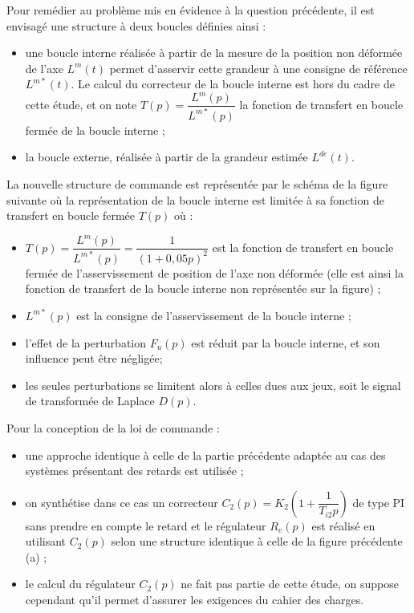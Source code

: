 Pour remédier au problème mis en évidence à la question précédente, il est envisagé une structure à deux boucles définies ainsi :
\begin{itemize}
\item une boucle interne réalisée à partir de la mesure de la position non déformée de l’axe $L^m(t)$ permet d’asservir cette grandeur à une consigne de référence $L^{m*}(t)$. Le calcul du correcteur de la boucle interne est hors du cadre de cette étude, et on note $T(p)=\dfrac{L^m(p)}{L^{m*}(p)}$ la fonction de transfert en boucle fermée de la boucle
interne ;
\item la boucle externe, réalisée à partir de la grandeur estimée $L^{de}(t)$.
\end{itemize}
La nouvelle structure de commande est représentée par le schéma de la figure suivante où la représentation de la
boucle interne est limitée à sa fonction de transfert en boucle fermée $T(p)$ où :
\begin{itemize}
\item $T(p) = \dfrac{L^m(p)}{L^{m*}(p)}= \dfrac{1}{\left(1+0,05p\right)^2}$ est la fonction de transfert en boucle fermée de l’asservissement de position de l’axe non déformée (elle est ainsi la fonction de transfert de la boucle interne non représentée sur la figure) ;
\item $L^{m*}(p)$ est la consigne de l’asservissement de la boucle interne ;
\item l’effet de la perturbation $F_u(p)$ est réduit par la boucle interne, et son influence peut être négligée;
\item les seules perturbations se limitent alors à celles dues aux jeux, soit le signal de transformée de Laplace $D(p)$.
\end{itemize}
Pour la conception de la loi de commande :
\begin{itemize}
\item une approche identique à celle de la partie précédente adaptée au cas des systèmes présentant des retards est utilisée ;
\item on synthétise dans ce cas un correcteur $C_2(p) = K_2 \left( 1+\dfrac{1}{T_{i2}p}\right) $ de type PI sans prendre en compte le retard et le régulateur $R_e(p)$ est réalisé en utilisant $C_2(p)$ selon une structure identique à celle de la figure précédente (a) ;
\item le calcul du régulateur $C_2(p)$ ne fait pas partie de cette étude, on suppose cependant qu’il permet d’assurer les exigences du cahier des charges.
\end{itemize}


